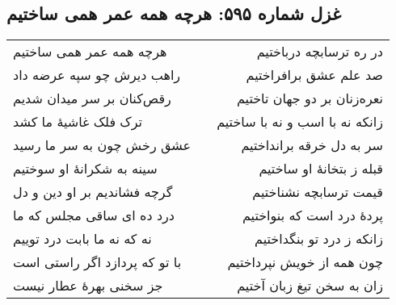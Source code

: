 \begin{center}
\section*{غزل شماره ۵۹۵: هرچه همه عمر همی ساختیم}
\label{sec:595}
\begin{longtable}{l p{0.5cm} r}
هرچه همه عمر همی ساختیم
&&
در ره ترسابچه درباختیم
\\
راهب دیرش چو سپه عرضه داد
&&
صد علم عشق برافراختیم
\\
رقص‌کنان بر سر میدان شدیم
&&
نعره‌زنان بر دو جهان تاختیم
\\
ترک فلک غاشیهٔ ما کشد
&&
زانکه نه با اسب و نه با ساختیم
\\
عشق رخش چون به سر ما رسید
&&
سر به دل خرقه برانداختیم
\\
سینه به شکرانهٔ او سوختیم
&&
قبله ز بتخانهٔ او ساختیم
\\
گرچه فشاندیم بر او دین و دل
&&
قیمت ترسابچه نشناختیم
\\
درد ده ای ساقی مجلس که ما
&&
پردهٔ درد است که بنواختیم
\\
نه که نه ما بابت درد توییم
&&
زانکه ز درد تو بنگداختیم
\\
با تو که پردازد اگر راستی است
&&
چون همه از خویش نپرداختیم
\\
جز سخنی بهرهٔ عطار نیست
&&
زان به سخن تیغ زبان آختیم
\\
\end{longtable}
\end{center}
